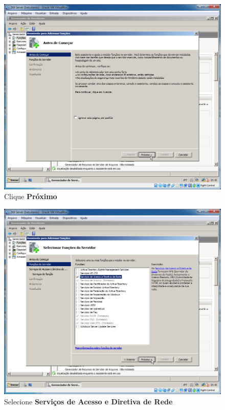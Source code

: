 \documentclass[10pt]{article}
\begin{document}
\begin{figure}[H]
    \centering
    \caption{Clique \textbf{Próximo}}
    \label{fig:re015}
    \includegraphics[width=\linewidth]{images/rede_externa/re015.png}
\end{figure}
\begin{figure}[H]
    \centering
    \caption{Selecione \textbf{Serviços de Acesso e Diretiva de Rede}}
    \label{fig:re017}
    \includegraphics[width=\linewidth]{images/rede_externa/re017.png}
\end{figure}
\end{document}
